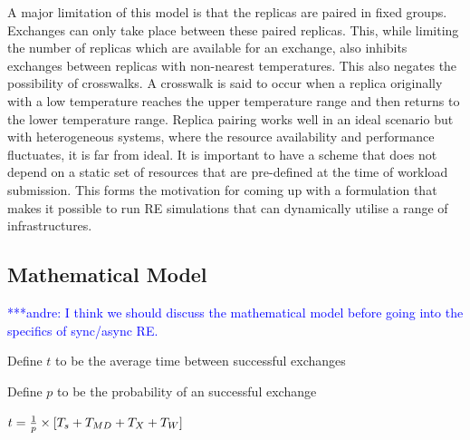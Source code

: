 \documentclass{rspublic}
\newcommand{\jhanote}[1]{ {\textcolor{red} { ***shantenu: #1 }}}
\newcommand{\alnote}[1]{ {\textcolor{blue} { ***andre: #1 }}}
\newcommand{\alnote}[1]{}
\newcommand{\jhanote}[1]{}
\begin{document}
A major limitation of this model is that the replicas are paired in
fixed groups.  Exchanges can only take place between these paired
replicas.  This, while limiting the number of replicas which are
available for an exchange, also inhibits exchanges between replicas
with non-nearest temperatures. This also negates the possibility of
crosswalks. A crosswalk is said to occur when a replica originally
with a low temperature reaches the upper temperature range and then
returns to the lower temperature
range. %
Replica pairing works well in an ideal scenario but with heterogeneous
systems, where the resource availability and performance fluctuates,
it is far from ideal. It is important to have a scheme that does not
depend on a static  set of
resources that are pre-defined at the time of workload submission.
This forms the motivation for coming up with a formulation that makes
it possible to run RE simulations that can dynamically utilise a range
of infrastructures.
  

\subsection{Mathematical Model}
\alnote{I think we should discuss the mathematical model before going into the specifics of sync/async RE.}

Define $t$ to be the average time between successful exchanges

Define $p$ to be the probability of an successful exchange

$t=  {1 \over p} \times {[T_s+T_{MD} + T_{X} + T_{W}]} $
\end{document}
